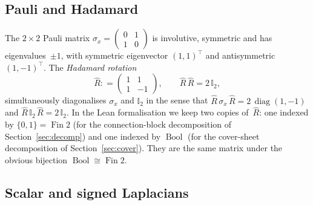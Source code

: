 \documentclass[11pt,a4paper]{amsart}
\theoremstyle{plain}
\theoremstyle{definition}
\theoremstyle{remark}
\DeclareMathOperator{\diag}{diag}
\newcommand{\II}{\mathbb{I}}
\newcommand{\defeq}{\mathrel{\mathop:}=}
\begin{document}
\subsection{Pauli and Hadamard}

The $2\times 2$ Pauli matrix $\sigma_x=\begin{pmatrix}0&1\\1&0\end{pmatrix}$
is involutive, symmetric and has eigenvalues~$\pm 1$, with
symmetric eigenvector $(1,1)^\top$ and antisymmetric
$(1,-1)^\top$. The \emph{Hadamard rotation}
\begin{equation}\label{eq:Rhat}
  \widehat R \defeq \begin{pmatrix} 1 & 1 \\ 1 & -1 \end{pmatrix},
  \qquad \widehat R\,\widehat R = 2\,\II_2,
\end{equation}
simultaneously diagonalises $\sigma_x$ and $\II_2$ in the sense
that $\widehat R\,\sigma_x\,\widehat R = 2\,\diag(1,-1)$ and
$\widehat R\,\II_2\,\widehat R = 2\,\II_2$. In the Lean
formalisation we keep two copies of~$\widehat R$: one indexed by
$\{0,1\}=\operatorname{Fin}2$ (for the connection-block
decomposition of Section~\ref{sec:decomp}) and one indexed by
$\operatorname{Bool}$ (for the cover-sheet decomposition of
Section~\ref{sec:cover}). They are the same matrix under the
obvious bijection $\operatorname{Bool}\cong \operatorname{Fin}2$.

\subsection{Scalar and signed Laplacians}
\end{document}
